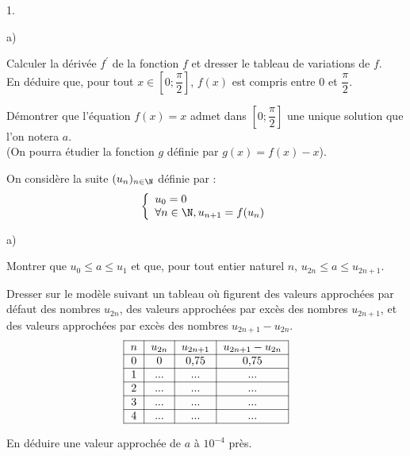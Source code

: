 \documentclass[11pt]{article}%
\begin{document}
\begin{noliste}{1.}
 \setlength{\itemsep}{4mm}
\item 

\begin{noliste}{a)}
 \setlength{\itemsep}{2mm}
\item Calculer la dérivée $f^{\prime }$ de la fonction $f$ et dresser
le
tableau de variations de $f$. \\
En déduire que, pour tout $x\in \left[ 0;\dfrac{\pi }{2}\right] $,
$f(x)$
est compris entre $0$ et $\dfrac{\pi }{2}$.

\item Démontrer que l'équation $f(x) = x$ admet dans $\left[
0;\dfrac{\pi }{2}\right] $ une unique solution que l'on notera $a$.\\
(On pourra étudier la fonction $g$ définie par $g(x) = f(x)-x$).
\end{noliste}

\item On considère la suite $(u_{n})_{n\in \N}$ définie par : 
\[
\left\{ 
\begin{array}{l}
u_{0} = 0 \\
\forall n\in \N,u_{n + 1} = f(u_{n})
\end{array}
\right.
\]

\begin{noliste}{a)}
 \setlength{\itemsep}{2mm}
\item Montrer que $u_{0}\leq a\leq u_{1}$ et que, pour tout entier
naturel $n$, $u_{2n}\leq a\leq u_{2n + 1}$.

\item Dresser sur le modèle suivant un tableau où figurent des valeurs
approchées par défaut des nombres $u_{2n}$, des valeurs approchées par
excès
des nombres $u_{2n + 1}$, et des valeurs approchées par excès des
nombres $u_{2n + 1}-u_{2n}$.
\[
\begin{tabular}{|c|c|c|c|}
\hline
$n$ & $u_{2n}$ & $u_{2n + 1}$ & $u_{2n + 1}-u_{2n}$ \\
\hline
0 & 0 & 0,75 & 0,75 \\
\hline
1 &... &... &... \\
\hline
2 &... &... &... \\
\hline
3 &... &... &... \\
\hline
4 &... &... &... \\
\hline
\end{tabular}
\]

En déduire une valeur approchée de $a$ à $10^{-4}$ près.
\end{noliste}
\end{noliste}
\end{document}
